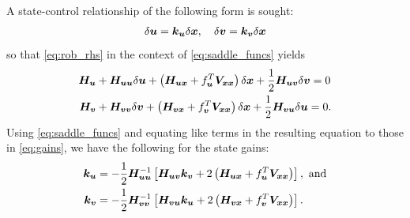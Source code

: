 A state-control relationship of the following form is sought:
%
\begin{align}
\delta \control = \gain_{\control} \delta \state, \quad \delta \disturb = \gain_{\disturb} \delta \state
\label{eq:gains}
\end{align}
%
so that \eqref{eq:rob_rhs} in the context of  \eqref{eq:saddle_funcs}  yields 
%
\begin{subequations}
	\begin{align}
		\bm{H}_{\bm{u}} &+ \bm{H}_{\bm{u}  \bm{u}} \delta \bm{u}  + \left(\bm{H}_{\bm{u}  \bm{x}} + f_{\bm{u}}^T \bm{V}_{\bm{x} \bm{x}}\right) \delta \bm{x} + \dfrac{1}{2}\bm{H}_{\bm{u}  \bm{v}} \delta \bm{v} = 0 \\
		\bm{H}_{\bm{v}} &+ \bm{H}_{\bm{v}  \bm{v}} \delta \bm{v}  + \left(\bm{H}_{\bm{v}  \bm{x}} + f_{\bm{v}}^T \bm{V}_{\bm{x} \bm{x}}\right) \delta \bm{x} + \dfrac{1}{2}\bm{H}_{\bm{v}\bm{u}} \delta \bm{u} = 0.
	\end{align}
\end{subequations}
%
Using \eqref{eq:saddle_funcs} and equating like terms in the resulting equation to  those in \eqref{eq:gains}, we have the following for the state gains:
%
\begin{align}
	\bm{k}_{\bm{u}} &= - \dfrac{1}{2}\bm{H}_{\bm{u}  \bm{u}}^{-1} \left[ \bm{H}_{\bm{u}  \bm{v}}\bm{k}_{\bm{v}}  + 2\left(\bm{H}_{\bm{u}  \bm{x}} + f_{\bm{u}}^T \bm{V}_{\bm{x} \bm{x}}\right) \right], \text{ and} \\
	\bm{k}_{\bm{v}} &= - \dfrac{1}{2}\bm{H}_{\bm{v}  \bm{v}}^{-1} \left[\bm{H}_{\bm{v}  \bm{u}} \bm{k}_{\bm{u}} +  2\left(\bm{H}_{\bm{v}  \bm{x}} + f_{\bm{v}}^T \bm{V}_{\bm{x} \bm{x}}\right)\right]. \nonumber
\end{align}        

